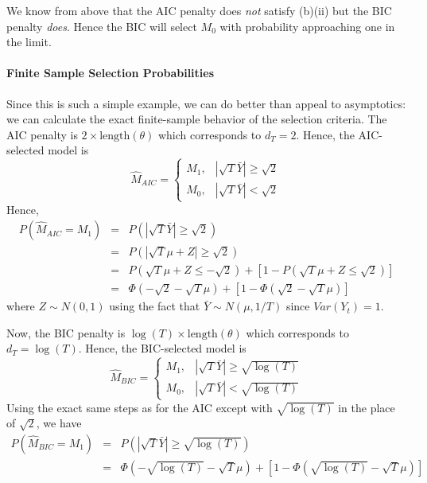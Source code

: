 We know from above that the AIC penalty does \emph{not} satisfy (b)(ii) but the BIC penalty \emph{does}. Hence the BIC will select $M_0$ with probability approaching one in the limit.

\paragraph{Finite Sample Selection Probabilities} Since this is such a simple example, we can do better than appeal to asymptotics: we can calculate the exact finite-sample behavior of the selection criteria. The AIC penalty is $2 \times \mbox{length}(\theta)$ which corresponds to $d_T = 2$. Hence, the AIC-selected model is
	$$\widehat{M}_{AIC} = \left\{\begin{array}
		{cc} M_1, &|\sqrt{T}\bar{Y}| \geq \sqrt{2} \\
		M_0, & |\sqrt{T} \bar{Y}| < \sqrt{2}
	\end{array} \right.$$
Hence,
	\begin{eqnarray*}
		P\left(\widehat{M}_{AIC} = M_1\right) &=& P\left(\left|\sqrt{T}\bar{Y} \right| \geq \sqrt{2}  \right)\\
		&=& P\left(\left|\sqrt{T}\mu + Z\right| \geq \sqrt{2}  \right)\\
		&=& P\left(\sqrt{T}\mu + Z \leq -\sqrt{2}\right) + \left[1 - P\left(\sqrt{T} \mu +Z \leq \sqrt{2}\right) \right]\\
			&=& \Phi\left(-\sqrt{2} - \sqrt{T}\mu\right) + \left[1 -  \Phi\left(\sqrt{2} - \sqrt{T} \mu \right)\right]
	\end{eqnarray*}
where $Z \sim N(0,1)$ using the fact that $\bar{Y} \sim N(\mu, 1/T)$ since $Var(Y_t)=1$.

Now, the BIC penalty is $\log(T)\times \mbox{length}(\theta)$ which corresponds to $d_T = \log(T)$. Hence, the BIC-selected model is
	$$\widehat{M}_{BIC} = \left\{\begin{array}
		{cc} M_1, & |\sqrt{T}\bar{Y} | \geq \sqrt{\log(T)} \\
		M_0, & |\sqrt{T} \bar{Y}| < \sqrt{\log(T)}
	\end{array} \right.$$
Using the exact same steps as for the AIC except with $\sqrt{\log(T)}$ in the place of $\sqrt{2}$, we have
	\begin{eqnarray*}
		P\left(\widehat{M}_{BIC} = M_1\right) &=& P\left(\left|\sqrt{T}\bar{Y} \right| \geq \sqrt{\log(T)}  \right)\\
			&=& \Phi\left(-\sqrt{\log(T)} - \sqrt{T}\mu\right) + \left[1 -  \Phi\left(\sqrt{\log(T)} - \sqrt{T} \mu \right)\right]
	\end{eqnarray*}


